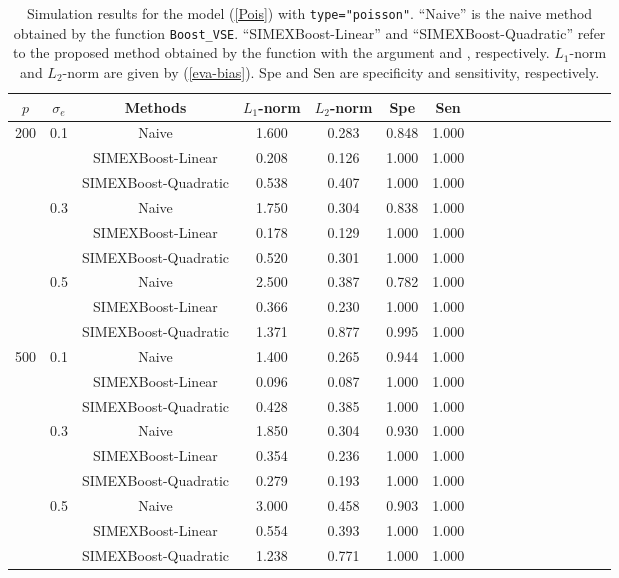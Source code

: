  \begin{table}[!ht]
       \huge
     \caption{Simulation results for the model (\ref{Pois}) with \texttt{type="poisson"}. ``Naive'' is the naive method obtained by the function \texttt{Boost\_VSE}. ``SIMEXBoost-Linear'' and ``SIMEXBoost-Quadratic'' refer to the proposed method obtained by the function  with the argument  and , respectively. $L_1$-norm and $L_2$-norm are given by (\ref{eva-bias}). Spe and Sen are specificity and sensitivity, respectively. } \label{tab:Sim-3}


 \scriptsize

\center
 \begin{tabular}{c c c c  ccccccccccccc}


 \hline
$p$  & $\sigma_e$  & Methods & $L_1$-norm & $L_2$-norm & Spe & Sen \\
\hline
200 & 0.1 & Naive & 1.600 & 0.283 & 0.848 & 1.000 \\
 &  & SIMEXBoost-Linear & 0.208 & 0.126 & 1.000 & 1.000 \\
 &  & SIMEXBoost-Quadratic & 0.538 & 0.407 & 1.000 & 1.000 \\
 & 0.3 & Naive & 1.750 & 0.304 & 0.838 & 1.000 \\
 &  & SIMEXBoost-Linear & 0.178 & 0.129 & 1.000 & 1.000 \\
 &  & SIMEXBoost-Quadratic & 0.520 & 0.301 & 1.000 & 1.000 \\
 & 0.5 & Naive & 2.500 & 0.387 & 0.782 & 1.000 \\
 &  & SIMEXBoost-Linear & 0.366 & 0.230 & 1.000 & 1.000 \\
 &  & SIMEXBoost-Quadratic & 1.371 & 0.877 & 0.995 & 1.000 \\
500 & 0.1 & Naive & 1.400 & 0.265 & 0.944 & 1.000 \\
 &  & SIMEXBoost-Linear & 0.096 & 0.087 & 1.000 & 1.000 \\
 &  & SIMEXBoost-Quadratic & 0.428 & 0.385 & 1.000 & 1.000 \\
 & 0.3 & Naive & 1.850 & 0.304 & 0.930 & 1.000 \\
 &  & SIMEXBoost-Linear & 0.354 & 0.236 & 1.000 & 1.000 \\
 &  & SIMEXBoost-Quadratic & 0.279 & 0.193 & 1.000 & 1.000 \\
 & 0.5 & Naive & 3.000 & 0.458 & 0.903 & 1.000 \\
 &  & SIMEXBoost-Linear & 0.554 & 0.393 & 1.000 & 1.000 \\
 &  & SIMEXBoost-Quadratic & 1.238 & 0.771 & 1.000 & 1.000 \\

\hline    


\end{tabular}

\end{table}


